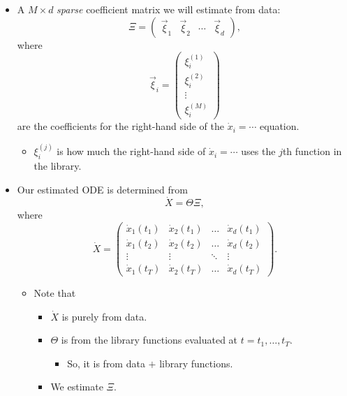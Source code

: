 \documentclass[20pt]{extarticle}
\begin{document}
\begin{itemize}
\begin{itemize}
	\item If we want to also consider $x_1 x_2$, then another column of $\Theta$ will be
\[ \begin{pmatrix} x_1(t_1) x_2(t_1) \\ x_1(t_2) x_2(t_2) \\ \vdots \\ x_1(t_T) x_2(t_T) \end{pmatrix}. \]
	\item We can assume any function such as $\sin(x_3(t))$, $\log(x_4(t))$, $x_1(t) x_5(t)^3$, etc.
	\end{itemize}
%
\item A $M \times d$ \emph{sparse} coefficient matrix we will estimate from data:
\[ \Xi = \begin{pmatrix} \vec{\xi}_1 & \vec{\xi}_2 & \cdots & \vec{\xi}_d \end{pmatrix}, \]
where
\[ \vec{\xi}_i = \begin{pmatrix} \xi_{i}^{(1)} \\ \xi_{i}^{(2)} \\ \vdots \\ \xi_{i}^{(M)} \end{pmatrix} \]
are the coefficients for the right-hand side of the $\dot{x}_i = \cdots$ equation.
	\begin{itemize}
	\item $\xi_i^{(j)}$ is how much the right-hand side of $\dot{x}_i = \cdots$ uses the $j$th function in the library.
	\end{itemize}
%
\item Our estimated ODE is determined from
\[ \dot{X} = \Theta \Xi, \]
where
\[ \dot{X} = \begin{pmatrix} \dot{x}_1(t_1) & \dot{x}_2(t_1) & \ldots & \dot{x}_d(t_1) \\
\dot{x}_1(t_2) & \dot{x}_2(t_2) & \ldots & \dot{x}_d(t_2) \\
\vdots & \vdots & \ddots & \vdots \\
\dot{x}_1(t_T) & \dot{x}_2(t_T) & \ldots & \dot{x}_d(t_T)
\end{pmatrix}. \]
	\begin{itemize}
	\item Note that
		\begin{itemize}
		\item $\dot{X}$ is purely from data.
		\item $\Theta$ is from the library functions evaluated at $t = t_1, \ldots, t_T$.
			\begin{itemize}
			\item So, it is from data $+$ library functions.
			\end{itemize}
		\item We estimate $\Xi$.
		\end{itemize}
	\end{itemize}
\end{itemize}
\end{document}

